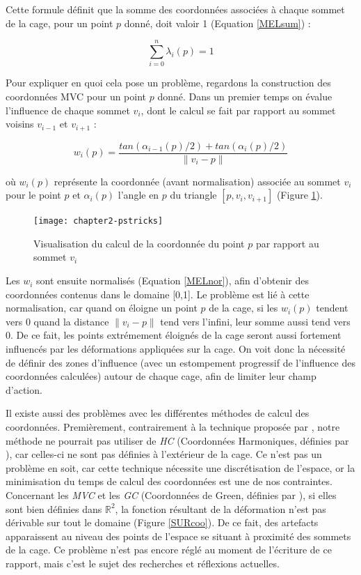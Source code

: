 Cette formule définit que la somme des coordonnées associées à chaque
sommet de la cage, pour un point $p$ donné, doit valoir 1 (Equation
\ref{MELsum}) :

\begin{equation}
  \sum_{i=0}^n \lambda_i(p) = 1
  \label{MELsum}
\end{equation}

Pour expliquer en quoi cela pose un problème, regardons la
construction des coordonnées MVC pour un point $p$ donné. Dans un
premier temps on évalue l'influence de chaque sommet $v_i$, dont le
calcul se fait par rapport au sommet voisins $v_{i-1}$ et $v_{i+1}$ :

\begin{equation}
  w_i(p) = \frac{tan(\alpha_{i-1}(p)/2) + tan(\alpha_{i}(p)/2)}{\|v_i - p\|}
\end{equation}

où $w_i(p)$ représente la coordonnée (avant normalisation) associée au
sommet $v_i$ pour le point $p$ et $\alpha_i(p)$ l'angle en $p$ du
triangle $[p,v_i,v_{i+1}]$ (Figure \ref{MELmvc}).

\begin{figure}[ht]
  \begin{center}
    \texttt{[image: chapter2-pstricks]}
    \caption{Visualisation du calcul de la coordonnée du point $p$ par
      rapport au sommet $v_i$}
    \label{MELmvc}
  \end{center}
\end{figure}

Les $w_i$ sont ensuite normalisés (Equation \ref{MELnor}), afin
d'obtenir des coordonnées contenus dans le domaine [0,1]. Le problème
est lié à cette normalisation, car quand on éloigne un point $p$ de la
cage, si les $w_i(p)$ tendent vers 0 quand la distance $\|v_i - p\|$
tend vers l'infini, leur somme aussi tend vers 0. De ce fait, les
points extrémement éloignés de la cage seront aussi fortement
influencés par les déformations appliquées sur la cage. On voit donc
la nécessité de définir des zones d'influence (avec un estompement
progressif de l'influence des coordonnées calculées) autour de chaque
cage, afin de limiter leur champ d'action.

Il existe aussi des problèmes avec les différentes méthodes de calcul
des coordonnées. Premièrement, contrairement à la technique proposée
par \cite{GPCP13}, notre méthode ne pourrait pas utiliser de
\textit{HC} (Coordonnées Harmoniques, définies par \cite{JMDGS07}),
car celles-ci ne sont pas définies à l'extérieur de la cage. Ce n'est
pas un problème en soit, car cette technique nécessite une
discrétisation de l'espace, or la minimisation du temps de calcul des coordonnées est
une de nos contraintes. Concernant les \textit{MVC} et les \textit{GC}
(Coordonnées de Green, définies par \cite{LLC08}), si elles sont bien
définies dans $\mathbb{R}^2$, la fonction résultant de la déformation
n'est pas dérivable sur tout le domaine (Figure \ref{SURcoo}). De ce
fait, des artefacts apparaissent au niveau des points de l'espace se
situant à proximité des sommets de la cage. Ce problème n'est pas
encore réglé au moment de l'écriture de ce rapport, mais c'est le
sujet des recherches et réflexions actuelles.

